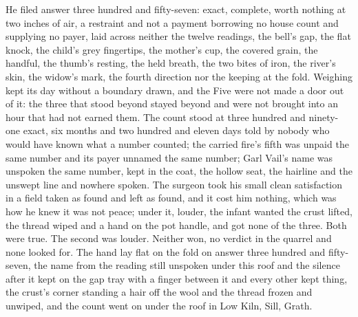 He filed answer three hundred and fifty-seven: exact, complete, worth nothing at two inches of air, a restraint and not a payment borrowing no house count and supplying no payer, laid across neither the twelve readings, the bell's gap, the flat knock, the child's grey fingertips, the mother's cup, the covered grain, the handful, the thumb's resting, the held breath, the two bites of iron, the river's skin, the widow's mark, the fourth direction nor the keeping at the fold. Weighing kept its day without a boundary drawn, and the Five were not made a door out of it: the three that stood beyond stayed beyond and were not brought into an hour that had not earned them. The count stood at three hundred and ninety-one exact, six months and two hundred and eleven days told by nobody who would have known what a number counted; the carried fire's fifth was unpaid the same number and its payer unnamed the same number; Garl Vail's name was unspoken the same number, kept in the coat, the hollow seat, the hairline and the unswept line and nowhere spoken. The surgeon took his small clean satisfaction in a field taken as found and left as found, and it cost him nothing, which was how he knew it was not peace; under it, louder, the infant wanted the crust lifted, the thread wiped and a hand on the pot handle, and got none of the three. Both were true. The second was louder. Neither won, no verdict in the quarrel and none looked for. The hand lay flat on the fold on answer three hundred and fifty-seven, the name from the reading still unspoken under this roof and the silence after it kept on the gap tray with a finger between it and every other kept thing, the crust's corner standing a hair off the wool and the thread frozen and unwiped, and the count went on under the roof in Low Kiln, Sill, Grath.
